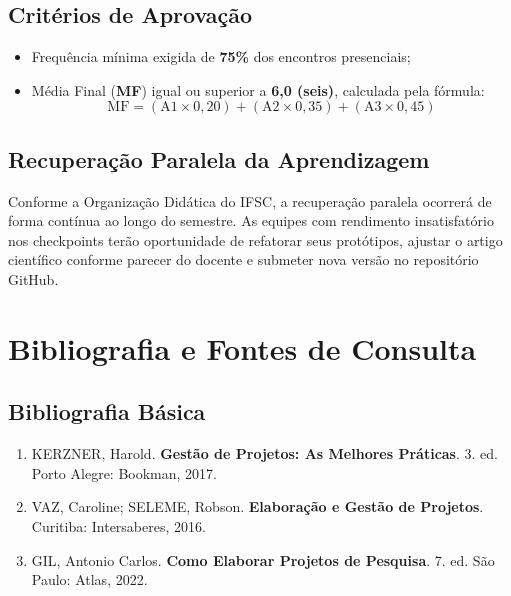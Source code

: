 \documentclass[12pt,a4paper]{article}
\begin{document}
\subsection{Critérios de Aprovação}
\begin{itemize}[leftmargin=*]
    \item Frequência mínima exigida de \textbf{75\%} dos encontros presenciais;
    \item Média Final (\textbf{MF}) igual ou superior a \textbf{6,0 (seis)}, calculada pela fórmula:
    \[
    \text{MF} = (\text{A1} \times 0{,}20) + (\text{A2} \times 0{,}35) + (\text{A3} \times 0{,}45)
    \]
\end{itemize}

\subsection{Recuperação Paralela da Aprendizagem}
Conforme a Organização Didática do IFSC, a recuperação paralela ocorrerá de forma contínua ao longo do semestre. As equipes com rendimento insatisfatório nos checkpoints terão oportunidade de refatorar seus protótipos, ajustar o artigo científico conforme parecer do docente e submeter nova versão no repositório GitHub.

\section{Bibliografia e Fontes de Consulta}

\subsection{Bibliografia Básica}
\begin{enumerate}[leftmargin=*]
    \item KERZNER, Harold. \textbf{Gestão de Projetos: As Melhores Práticas}. 3. ed. Porto Alegre: Bookman, 2017.
    \item VAZ, Caroline; SELEME, Robson. \textbf{Elaboração e Gestão de Projetos}. Curitiba: Intersaberes, 2016.
    \item GIL, Antonio Carlos. \textbf{Como Elaborar Projetos de Pesquisa}. 7. ed. São Paulo: Atlas, 2022.
\end{enumerate}
\end{document}
